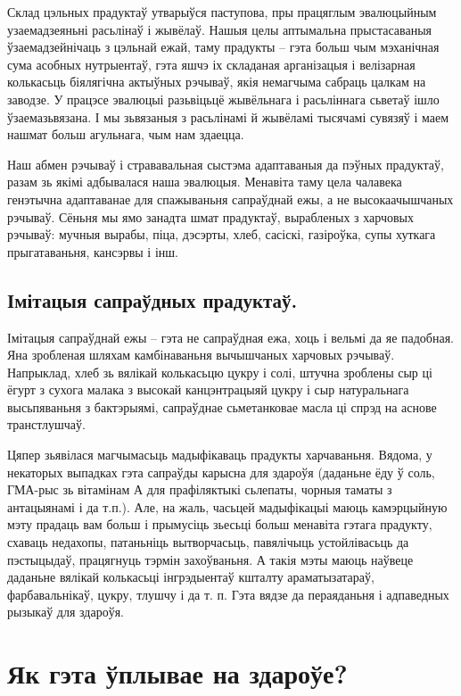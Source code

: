 Склад цэльных прадуктаў утварыўся паступова, пры працяглым эвалюцыйным узаемадзеяньні расьлінаў і жывёлаў. Нашыя целы аптымальна прыстасаваныя ўзаемадзейнічаць з цэльнай ежай, таму прадукты – гэта больш чым мэханічная сума асобных нутрыентаў, гэта яшчэ іх складаная арганізацыя і велізарная колькасьць біялягічна актыўных рэчываў, якія немагчыма сабраць цалкам на заводзе. У працэсе эвалюцыі разьвіцьцё жывёльнага і расьліннага сьветаў ішло ўзаемазьвязана. І мы зьвязаныя з расьлінамі й жывёламі тысячамі сувязяў і маем нашмат больш агульнага, чым нам здаецца.

Наш абмен рэчываў і стрававальная сыстэма адаптаваныя да пэўных прадуктаў, разам зь якімі адбывалася наша эвалюцыя. Менавіта таму цела чалавека генэтычна адаптаванае для спажываньня сапраўднай ежы, а не высокаачышчаных рэчываў. Сёньня мы ямо занадта шмат прадуктаў, вырабленых з харчовых рэчываў: мучныя вырабы, піца, дэсэрты, хлеб, сасіскі, газіроўка, супы хуткага прыгатаваньня, кансэрвы і інш.

\subsection{Імітацыя сапраўдных прадуктаў.}
Імітацыя сапраўднай ежы – гэта не сапраўдная ежа, хоць і вельмі да яе падобная. Яна зробленая шляхам камбінаваньня вычышчаных харчовых рэчываў. Напрыклад, хлеб зь вялікай колькасьцю цукру і солі, штучна зроблены сыр ці ёгурт з сухога малака з высокай канцэнтрацыяй цукру і сыр натуральнага высьпяваньня з бактэрыямі, сапраўднае сьметанковае масла ці спрэд на аснове транстлушчаў.

Цяпер зьявілася магчымасьць мадыфікаваць прадукты харчаваньня. Вядома, у некаторых выпадках гэта сапраўды карысна для здароўя (даданьне ёду ў соль, ГМА-рыс зь вітамінам А для прафіляктыкі сьлепаты, чорныя таматы з антацыянамі і да т.п.). Але, на жаль, часьцей мадыфікацыі маюць камэрцыйную мэту прадаць вам больш і прымусіць зьесьці больш менавіта гэтага прадукту, схаваць недахопы, патаньніць вытворчасьць, павялічыць устойлівасьць да пэстыцыдаў, працягнуць тэрмін захоўваньня. А такія мэты маюць наўвеце даданьне вялікай колькасьці інгрэдыентаў кшталту араматызатараў, фарбавальнікаў, цукру, тлушчу і да т. п. Гэта вядзе да пераяданьня і адпаведных рызыкаў для здароўя.

\section{Як гэта ўплывае на здароўе?}

